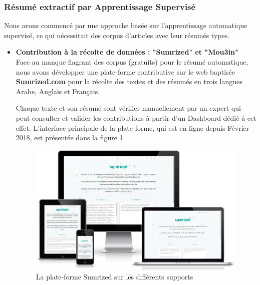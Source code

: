         \subsubsection{Résumé extractif par Apprentissage Supervisé}
            Nous avons commencé par une approche basée sur l'apprentissage automatique supervisé, ce qui nécessitait des corpus d'articles avec leur résumés types.
            \begin{itemize}
                 \item{\textbf{Contribution à la récolte de données : "Sumrized" et "Mou3in"}}\\
                Face au manque flagrant des corpus (gratuits) pour le résumé automatique, nous avons développer une plate-forme contributive sur le web baptisée \textbf{Sumrized.com} pour la récolte des textes et des résumés en trois langues Arabe, Anglais et Français. 

                Chaque texte et son résumé sont vérifier manuellement par un expert qui peut consulter et valider les contributions à partir d'un Dashboard dédié à cet effet. L'interface principale de la plate-forme, qui est en ligne depuis Février 2018, est présentée dans la figure \ref{sumrized-ui}. 

                \begin{figure}[H]
                    \centering
                    \includegraphics[height=180pt,width=320pt]{img/chapter4/sumrized/responsive.png}
                    \caption{La plate-forme Sumrized sur les différents supports}
                    \label{sumrized-ui}
                \end{figure} 


\end{itemize}
